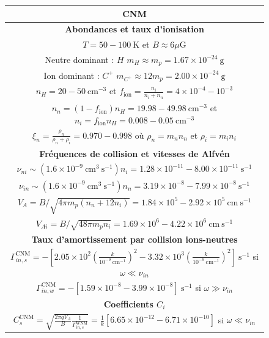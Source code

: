 \documentclass[10pt,a4paper]{article}
\begin{document}
\begin{figure}[h]
\centering
\begin{tabular}{|c|}
\hline
CNM \\
\hline
\hline  
\bf{Abondances et taux d'ionisation}\\ 
\hline
$T = 50 - 100~\mathrm{K}$ et $B \approx 6 \mu\mathrm{G}$ \\  
Neutre dominant : $H$ $m_H \approx m_p = 1.67 \times 10^{-24}~\mathrm{g}$ \\ 
Ion dominant : $C^+$ $m_{C^+} \approx 12m_p = 2.00 \times 10^{-24}~\mathrm{g}$    \\
\hline
$n_H = 20 - 50~\mathrm{cm}^{-3}$ et $f_\mathrm{ion} = \frac{n_i}{n_i+n_n} = 4\times 10^{-4} - 10^{-3}$ \\ 
$n_n = (1-f_\mathrm{ion})n_H = 19.98-49.98~\mathrm{cm}^{-3}$ et $n_i = f_\mathrm{ion}n_H = 0.008 - 0.05~\mathrm{cm}^{-3}$ \\
$\xi_n = \frac{\rho_n}{\rho_n+\rho_i} = 0.970 - 0.998$ où $\rho_n = m_n n_n$ et $\rho_i = m_i n_i$ \\ 
\hline
\hline
\bf{Fréquences de collision et vitesses de Alfvén}\\
\hline
$\nu_{ni} \sim (1.6\times 10^{-9}~\mathrm{cm}^3~\mathrm{s}^{-1}) n_i = 1.28\times 10^{-11} - 8.00\times 10^{-11}~\mathrm{s}^{-1}$ \\ 
$\nu_{in} \sim (1.6\times 10^{-9}~\mathrm{cm}^3~\mathrm{s}^{-1}) n_n = 3.19\times 10^{-8} - 7.99\times 10^{-8}~\mathrm{s}^{-1}$ \\ 
\hline 
$V_A = B/\sqrt{4\pi m_p (n_n +12n_i)} = 1.84\times 10^5 - 2.92 \times 10^5 ~\mathrm{cm}~\mathrm{s}^{-1}$ \\ 
$V_{Ai} = B/\sqrt{48\pi m_p n_i} = 1.69\times 10^6 - 4.22\times 10^6~\mathrm{cm}~\mathrm{s}^{-1}$ \\ 
\hline 
\hline
\bf{Taux d'amortissement par collision ions-neutres} \\ 
\hline
$\Gamma^\mathrm{CNM}_{in,s} = - \left[ 2.05\times 10^{2} \left( \frac{k}{10^{-9}~\mathrm{cm}^{-1}} \right)^2 - 3.32\times 10^{3} \left( \frac{k}{10^{-9}~\mathrm{cm}^{-1}} \right)^2 \right]~\mathrm{s}^{-1}$ si $\omega \ll \nu_{in}$ \\ 
$\Gamma^\mathrm{CNM}_{in,w} = - \left[ 1.59\times 10^{-8} - 3.99 \times 10^{-8} \right]~\mathrm{s}^{-1}$ si $\omega \gg \nu_{in}$ \\
\hline
\hline
\bf{Coefficients $C_i$} \\
\hline
$C^\mathrm{CNM}_s = \sqrt{\frac{2\pi qV_A}{B} \frac{1}{\Gamma^\mathrm{WNM}_{in,s}}} = \frac{1}{k} [ 6.65 \times 10^{-12} - 6.71 \times 10^{-10} ]$ si $\omega \ll \nu_{in}$ \\ 

\end{tabular}
\end{figure}
\end{document}
